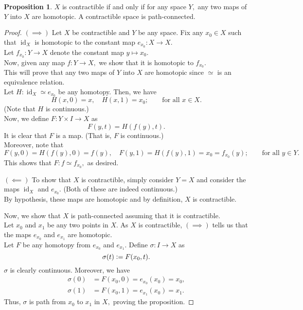 \documentclass[12pt]{article}
\theoremstyle{definition}
\numberwithin{thm}{section}
\newtheorem{prop}[thm]{Proposition}
\newcommand{\id}{\operatorname{id}}
\begin{document}
\begin{prop} \label{prop:contracpath} %
	$X$ is contractible if and only if for any space $Y,$ any two maps of $Y$ into $X$ are homotopic. A contractible space is path-connected.
\end{prop}
\begin{proof} 
	$(\implies)$ Let $X$ be contractible and $Y$ be any space. Fix any $x_0 \in X$ such that $\id_X$ is homotopic to the constant map $e_{x_0}:X\to X.$ \\
	Let $f_{x_0}:Y\to X$ denote the constant map $y \mapsto x_0.$\\
	Now, given any map $f:Y\to X,$ we show that it is homotopic to $f_{x_0}.$ \\This will prove that any two maps of $Y$ into $X$ are homotopic since $\simeq$ is an equivalence relation.\\
	Let $H:\id_X \simeq e_{x_0}$ be any homotopy. Then, we have
	\begin{equation*} 
		H(x, 0) = x,\quad H(x, 1) = x_0; \qquad \text{for all } x \in X.
	\end{equation*}
	(Note that $H$ is continuous.)\\
	Now, we define $F:Y\times I \to X$ as
	\begin{equation*} 
		F(y, t) = H(f(y), t).
	\end{equation*}
	It is clear that $F$ is a map. (That is, $F$ is continuous.)\\
	Moreover, note that
	\begin{equation*} 
		F(y, 0) = H(f(y), 0) = f(y), \quad F(y, 1) = H(f(y), 1) = x_0 = f_{x_0}(y); \qquad \text{for all } y \in Y.
	\end{equation*}
	This shows that $F:f\simeq f_{x_0},$ as desired.

	$(\impliedby)$ To show that $X$ is contractible, simply consider $Y = X$ and consider the maps $\id_X$ and $e_{x_0}.$ (Both of these are indeed continuous.)\\
	By hypothesis, these maps are homotopic and by definition, $X$ is contractible.

	Now, we show that $X$ is path-connected assuming that it is contractible.\\
	Let $x_0$ and $x_1$ be any two points in $X.$ As $X$ is contractible, $(\implies)$ tells us that the maps $e_{x_0}$ and $e_{x_1}$ are homotopic. \\
	Let $F$ be any homotopy from $e_{x_0}$ and $e_{x_1}.$ Define $\sigma:I\to X$ as 
	\begin{equation*} 
		\sigma(t) \vcentcolon= F(x_0, t).
	\end{equation*}
	$\sigma$ is clearly continuous. Moreover, we have
	\begin{align*} 
		\sigma(0) &= F(x_0, 0) = e_{x_0}(x_0) = x_0,\\
		\sigma(1) &= F(x_0, 1) = e_{x_1}(x_0) = x_1.
	\end{align*}
	Thus, $\sigma$ is path from $x_0$ to $x_1$ in $X,$ proving the proposition.
\end{proof}
\end{document}
